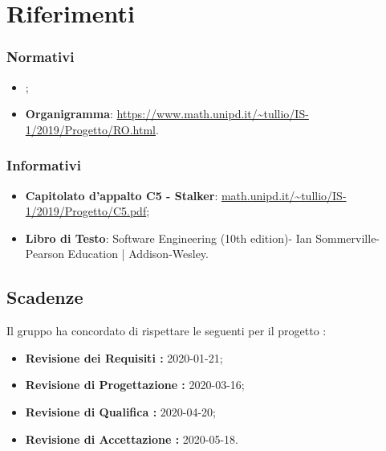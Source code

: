 \section{Riferimenti}
\subsubsection{Normativi}
\begin{itemize}
    \item {};
    \item \textbf{Organigramma}: \url{https://www.math.unipd.it/~tullio/IS-1/2019/Progetto/RO.html}.
\end{itemize}   
\subsubsection{Informativi}
\begin{itemize}
    \item \textbf{Capitolato d'appalto C5 - Stalker}: \url{math.unipd.it/~tullio/IS-1/2019/Progetto/C5.pdf};
    \item \textbf{Libro di Testo}: Software Engineering (10th edition)- Ian Sommerville- Pearson Education | Addison-Wesley.
\end{itemize}

\subsection{Scadenze}
Il gruppo \Gruppo{} ha concordato di rispettare le seguenti  per il progetto \NomeProgetto{}:
\begin{itemize}
    \item \textbf{Revisione dei Requisiti : } 2020-01-21;
    \item \textbf{Revisione di Progettazione : } 2020-03-16;
    \item \textbf{Revisione di Qualifica : } 2020-04-20;
    \item \textbf{Revisione di Accettazione : } 2020-05-18.
\end{itemize}